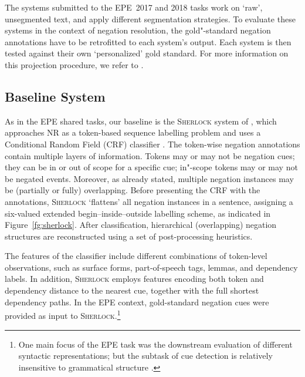 \documentclass[11pt,a4paper]{article}
\theoremstyle{plain}
\begin{document}
\iffalse
The annotations contain linguistic signals of negations, \emph{cues},
that can be either simple single token cues, multi"-word cues or
affixal cues.
Each cue is assigned a \emph{scope}, that is tokens that are affected
by the negation, and negated \emph{events}, scope tokens that are the
focus of the negation and are factual.
As there may be multiple negation instances in one sentence, and
scopes may overlap or nest within each other.
\fi


The systems submitted to the EPE~2017 and 2018 tasks work on
`raw', unsegmented text, and apply different segmentation strategies.
To evaluate these systems in the context of negation resolution, 
the gold"-standard negation annotations have to
be retrofitted to each system's output.
Each system is then tested against their own
`personalized' gold standard.
For more information on this projection procedure, we refer
to \citet{Lap:Oep:Ovr:17}.

\subsection{Baseline System}

As in the EPE shared tasks, our baseline is the \textsc{Sherlock}
system of \citet{Lap:Vel:Ovr:12,Lap:Oep:Ovr:17}, which approaches NR as a token-based sequence labelling problem and uses
a Conditional Random Field (CRF) classifier \cite{Lav:Cap:Yvo:10}.
The token-wise negation annotations contain multiple layers of
information.
Tokens may or may not be negation cues; they can be in or out
of scope for a specific cue; in"-scope tokens may or may not be negated
events.
Moreover, as already stated, multiple negation instances may be (partially or fully)
overlapping.
Before presenting the CRF with the annotations, \textsc{Sherlock} `flattens' all
negation instances in a sentence, assigning a six-valued extended
begin--inside--outside labelling scheme, as indicated in
Figure~\ref{fg:sherlock}.
After classification, hierarchical (overlapping) negation structures
are reconstructed using a set of post-processing heuristics.

The features of the classifier include different combinations of
token-level observations, such as surface forms, part-of-speech tags,
lemmas, and dependency labels. 
In addition, \textsc{Sherlock} employs features encoding both token and
dependency distance to the nearest cue, together with the full
shortest dependency paths.
In the EPE context, gold-standard negation cues were provided as input
to \textsc{Sherlock}.\footnote{One main focus of the EPE task was the downstream evaluation of different syntactic representations; but the subtask of cue detection is relatively
insensitive to grammatical structure \cite{Vel:Ovr:Rea:12}.}
\end{document}

